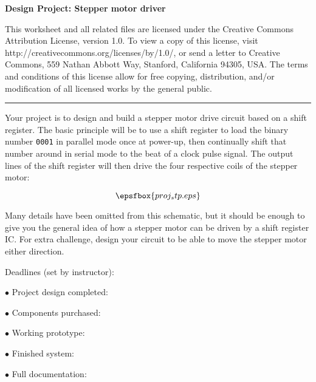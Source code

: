 
\centerline{\bf Design Project: Stepper motor driver} \bigskip 
 
This worksheet and all related files are licensed under the Creative Commons Attribution License, version 1.0.  To view a copy of this license, visit http://creativecommons.org/licenses/by/1.0/, or send a letter to Creative Commons, 559 Nathan Abbott Way, Stanford, California 94305, USA.  The terms and conditions of this license allow for free copying, distribution, and/or modification of all licensed works by the general public.

\bigskip 

\hrule

\vskip 10pt

Your project is to design and build a stepper motor drive circuit based on a shift register.  The basic principle will be to use a shift register to load the binary number {\tt 0001} in parallel mode once at power-up, then continually shift that number around in serial mode to the beat of a clock pulse signal.  The output lines of the shift register will then drive the four respective coils of the stepper motor:

$$\epsfbox{proj_stp.eps}$$

Many details have been omitted from this schematic, but it should be enough to give you the general idea of how a stepper motor can be driven by a shift register IC.  For extra challenge, design your circuit to be able to move the stepper motor either direction.

\vskip 10pt

\goodbreak
\noindent
Deadlines (set by instructor):

\medskip
\item{$\bullet$} Project design completed: 
\item{$\bullet$} Components purchased:
\item{$\bullet$} Working prototype:
\item{$\bullet$} Finished system:
\item{$\bullet$} Full documentation:
\medskip



